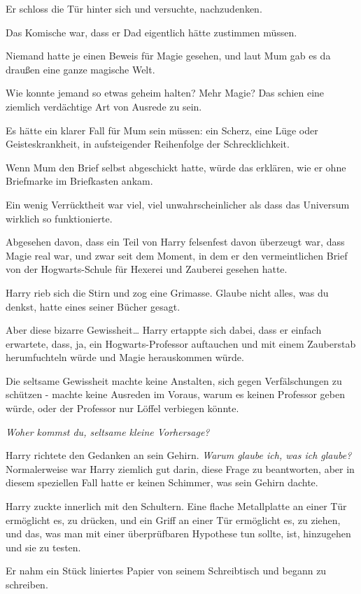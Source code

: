 {Er schloss die Tür hinter sich und versuchte, nachzudenken.

Das Komische war, dass er Dad eigentlich hätte zustimmen müssen.

Niemand hatte je einen Beweis für Magie gesehen, und laut Mum gab es da draußen eine ganze magische Welt.

Wie konnte jemand so etwas geheim halten? Mehr Magie? Das schien eine ziemlich verdächtige Art von Ausrede zu sein.

Es hätte ein klarer Fall für Mum sein müssen: ein Scherz, eine Lüge oder Geisteskrankheit, in aufsteigender Reihenfolge der Schrecklichkeit.

Wenn Mum den Brief selbst abgeschickt hatte, würde das erklären, wie er ohne Briefmarke im Briefkasten ankam.

Ein wenig Verrücktheit war viel, viel unwahrscheinlicher als dass das Universum wirklich so funktionierte.

Abgesehen davon, dass ein Teil von Harry felsenfest davon überzeugt war, dass Magie real war, und zwar seit dem Moment, in dem er den vermeintlichen Brief von der Hogwarts-Schule für Hexerei und Zauberei gesehen hatte.

Harry rieb sich die Stirn und zog eine Grimasse. Glaube nicht alles, was du denkst, hatte eines seiner Bücher gesagt.

Aber diese bizarre Gewissheit… Harry ertappte sich dabei, dass er einfach erwartete, dass, ja, ein Hogwarts-Professor auftauchen und mit einem Zauberstab herumfuchteln würde und Magie herauskommen würde.

Die seltsame Gewissheit machte keine Anstalten, sich gegen Verfälschungen zu schützen - machte keine Ausreden im Voraus, warum es keinen Professor geben würde, oder der Professor nur Löffel verbiegen könnte.

\emph{Woher kommst du, seltsame kleine Vorhersage?}

Harry richtete den Gedanken an sein Gehirn. \emph{Warum glaube ich, was ich glaube?} Normalerweise war Harry ziemlich gut darin, diese Frage zu beantworten, aber in diesem speziellen Fall hatte er keinen Schimmer, was sein Gehirn dachte.

Harry zuckte innerlich mit den Schultern. Eine flache Metallplatte an einer Tür ermöglicht es, zu drücken, und ein Griff an einer Tür ermöglicht es, zu ziehen, und das, was man mit einer überprüfbaren Hypothese tun sollte, ist, hinzugehen und sie zu testen.

Er nahm ein Stück liniertes Papier von seinem Schreibtisch und begann zu schreiben.

}

